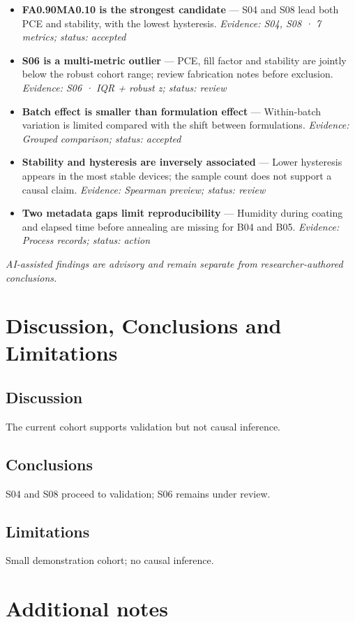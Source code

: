 \documentclass[10pt,a4paper]{article}
\begin{document}
\begin{itemize}
\item \textbf{FA0.90MA0.10 is the strongest candidate} — S04 and S08 lead both PCE and stability, with the lowest hysteresis. \textit{Evidence: S04, S08 · 7 metrics; status: accepted}
\item \textbf{S06 is a multi-metric outlier} — PCE, fill factor and stability are jointly below the robust cohort range; review fabrication notes before exclusion. \textit{Evidence: S06 · IQR + robust z; status: review}
\item \textbf{Batch effect is smaller than formulation effect} — Within-batch variation is limited compared with the shift between formulations. \textit{Evidence: Grouped comparison; status: accepted}
\item \textbf{Stability and hysteresis are inversely associated} — Lower hysteresis appears in the most stable devices; the sample count does not support a causal claim. \textit{Evidence: Spearman preview; status: review}
\item \textbf{Two metadata gaps limit reproducibility} — Humidity during coating and elapsed time before annealing are missing for B04 and B05. \textit{Evidence: Process records; status: action}
\end{itemize}
\textit{AI-assisted findings are advisory and remain separate from researcher-authored conclusions.}

\section{Discussion, Conclusions and Limitations}

\subsection{Discussion}
The current cohort supports validation but not causal inference.
\subsection{Conclusions}
S04 and S08 proceed to validation; S06 remains under review.
\subsection{Limitations}
Small demonstration cohort; no causal inference.

\section{Additional notes}
\end{document}
